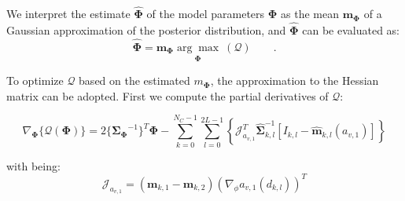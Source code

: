 We interpret the estimate $\hat{\mathbf{\Phi}}$ of the model
parameters $\mathbf{\Phi}$ as  the mean $\mathbf{m}_{\mathbf{\Phi}}$ of a Gaussian
approximation of the posterior distribution, and
$\hat{\mathbf{\Phi}}$ can be evaluated as:
\begin{equation}
  \label{eq:maxcost}
  \hat{\mathbf{\Phi}} =
  \mathbf{m}_{\mathbf{\Phi}}\underset{\mathbf{\Phi}}{\arg\max} \
  (\mathcal{Q}) \qquad.
\end{equation}

To optimize $\mathcal{Q}$ based on the estimated $m_{\mathbf{\Phi}}$,
the approximation to the Hessian matrix can be adopted. First we
compute the partial derivatives of $\mathcal{Q}$:

\begin{equation}
\label{eq:partcost}
\nabla_{\mathbf{\Phi}}\{{\mathcal{Q}(\mathbf{\Phi})}\} =  2\{{\mathbf{\Sigma}_{\mathbf{\Phi}}}^{-1}\}^{T}{\mathbf{\Phi}} - \sum_{k = 0}^{N_{C}-1} \sum_{l=0}^{2L-1}
\left\{\mathcal{J}_{a_{v,1}}^T\hat{\mathbf{\Sigma}}_{k,l}^{-1}\left[I_{k,l}-\hat{\mathbf{m}}_{k,l}(a_{v,1})\right]\right\}
\end{equation}

with being:
\begin{equation}
  \label{eq:jocob}
  \mathcal{J}_{a_{v,1}} = \left( \mathbf{m}_{k,1} -\mathbf{m}_{k,2} \right)(\nabla_{\phi} a_{v,1}(d_{k,l}))^T
\end{equation}

